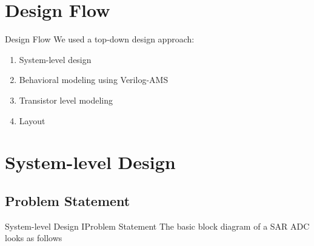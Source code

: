 \documentclass{beamer}
\begin{document}
 \section{Design Flow}
 \begin{frame}{Design Flow}
  We used a top-down design approach:
  \vspace{2em}
  \begin{enumerate}
   \item System-level design
   \item Behavioral modeling using Verilog-AMS
   \item Transistor level modeling
   \item Layout
  \end{enumerate}
  \vspace{2em}
 \end{frame}
 

 \section{System-level Design}
 \subsection{Problem Statement}
 \begin{frame}
  {System-level Design I}{Problem Statement}
  The basic block diagram of a SAR ADC looks as follows

  \vspace*{2em}
  \resizebox{\textwidth}{!}{}
 \end{frame}
\end{document}
